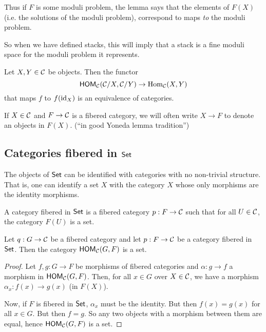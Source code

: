 \documentclass[11pt, english]{article}
\begin{document}
Thus if $F$ is some moduli problem, the lemma says that the elements of $F(X)$ (i.e. the solutions of the moduli problem), correspond to maps \emph{to} the moduli problem.

So when we have defined stacks, this will imply that a stack is a fine moduli space for the moduli problem it represents.

\begin{corr}
Let $X,Y \in \mathcal{C}$ be objects. Then the functor
\[
\operatorname{\mathsf{HOM}}_{\mathcal{C}}(\mathcal{C}/X, \mathcal{C}/Y) \to \operatorname{Hom}_{\mathcal{C}}(X,Y)
\]
that maps $f$ to $f(\text{id}_X)$ is an equivalence of categories.
\end{corr}

\begin{remark} If $X \in \mathcal{C}$ and $F \to \mathcal{C}$ is a fibered category, we will often write $X \to F$ to denote an objects in $F(X)$. (``in good Yoneda lemma tradition'')
\end{remark}



\subsection{Categories fibered in $\mathsf{Set}$}

The objects of $\mathsf{Set}$ can be identified with categories with no non-trivial structure. That is, one can identify a set $X$ with the category $X$ whose only morphisms are the identity morphisms.

\begin{defi}
A category fibered in $\mathsf{Set}$ is a fibered category $p:F \to \mathcal{C}$ such that for all $U \in \mathcal{C}$, the category $F(U)$ is a set.
\end{defi}

\begin{lemma}
Let $q:G \to \mathcal{C}$ be a fibered category and let $p:F \to \mathcal{C}$ be a category fibered in $\mathsf{Set}$. Then the category $\operatorname{\mathsf{HOM}}_{\mathcal{C}}(G,F)$ is a set.
\end{lemma}
\begin{proof}
Let $f,g:G \to F$ be morphisms of fibered categories and $\alpha:g \to f$ a morphism in $\operatorname{\mathsf{HOM}}_{\mathcal{C}}(G,F)$. Then, for all $x \in G$ over $X \in \mathcal{C}$, we have a morphism $\alpha_x:f(x) \to g(x)$ (in $F(X)$). 

Now, if $F$ is fibered in $\mathsf{Set}$, $\alpha_x$ must be the identity. But then $f(x)=g(x)$ for all $x \in G$. But then $f=g$. So any two objects with a morphism between them are equal, hence $\operatorname{\mathsf{HOM}}_{\mathcal{C}}(G,F)$ is a set.
\end{proof}
\end{document}
